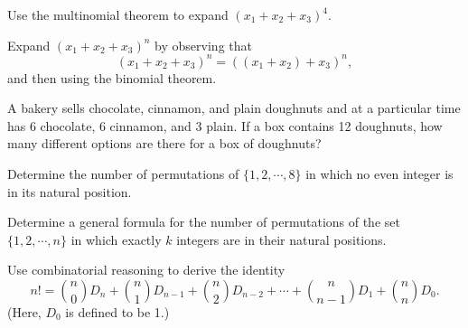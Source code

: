 
\begin{problem}[5.38]
  Use the multinomial theorem to expand $(x_1 + x_2 + x_3)^4$.
\end{problem}

\begin{solution}
\end{solution}

\begin{problem}[5.41]
  Expand $(x_1 + x_2 + x_3)^n$ by observing that
  \[%
    (x_1 + x_2 + x_3)^n = ((x_1 + x_2) + x_3)^n
  ,\]%
  and then using the binomial theorem.
\end{problem}

\begin{solution}
\end{solution}

\begin{problem}[6.1]
\end{problem}

\begin{solution}
\end{solution}

\begin{problem}[6.6]
  A bakery sells chocolate, cinnamon, and plain doughnuts and at a particular time has 6 chocolate, 6 cinnamon, and 3 plain. If a box contains 12 doughnuts, how many different options are there for a box of doughnuts?
\end{problem}

\begin{solution}
\end{solution}

\begin{problem}[6.11]
  Determine the number of permutations of $\{1, 2, \cdots, 8\}$ in which no even integer is in its natural position.
\end{problem}

\begin{solution}
\end{solution}

\begin{problem}[6.14]
  Determine a general formula for the number of permutations of the set $\{1, 2, \cdots, n\}$ in which exactly $k$ integers are in their natural positions.
\end{problem}

\begin{solution}
\end{solution}

\begin{problem}[6.16]
  Use combinatorial reasoning to derive the identity
  \[%
    n! = \binom{n}{0} D_n + \binom{n}{1} D_{n-1} + \binom{n}{2} D_{n-2} + \cdots + \binom{n}{n-1} D_1 + \binom{n}{n} D_0
  .\]%
  (Here, $D_0$ is defined to be 1.)
\end{problem}

\begin{solution}
\end{solution}
